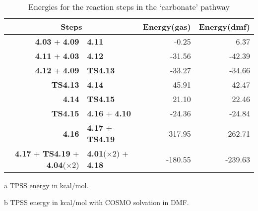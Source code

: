 \begin{table}[!htb]
\centering
 \begin{threeparttable}
  \caption{Energies for the reaction steps in the `carbonate' pathway}
    \begin{tabular}{r@{ $\rightarrow$ }lrr}
    \toprule
    \multicolumn{2}{c}{Steps} & Energy(gas)\tnote{a} & Energy(dmf)\tnote{b} \\
    \midrule
    \textbf{4.03} + \textbf{4.09} & \textbf{4.11} & -0.25 & 6.37 \\
    \textbf{4.11} + \textbf{4.03} & \textbf{4.12} & -31.56 & -42.39 \\
    \textbf{4.12} + \textbf{4.09} & \textbf{TS4.13} & -33.27 & -34.66 \\
    \textbf{TS4.13} & \textbf{4.14} & 45.91 & 42.47 \\
    \textbf{4.14} & \textbf{TS4.15} & 21.10 & 22.46 \\
    \textbf{TS4.15} & \textbf{4.16} + \textbf{4.10} & -24.36 & -24.84 \\
    \textbf{4.16} & \textbf{4.17} + \textbf{TS4.19} & 317.95 & 262.71 \\
    \textbf{4.17} + \textbf{TS4.19} + \textbf{4.04}($\times 2$) & \textbf{4.01}($\times 2$) + \textbf{4.18} & -180.55 & -239.63 \\
    \bottomrule
    \end{tabular}%
    \begin{tablenotes}
    \item [a] TPSS energy in kcal/mol.
    \item [b] TPSS energy in kcal/mol with COSMO solvation in DMF.
    \end{tablenotes}
  \label{tab.carbrxn}%
 \end{threeparttable}
\end{table}%
